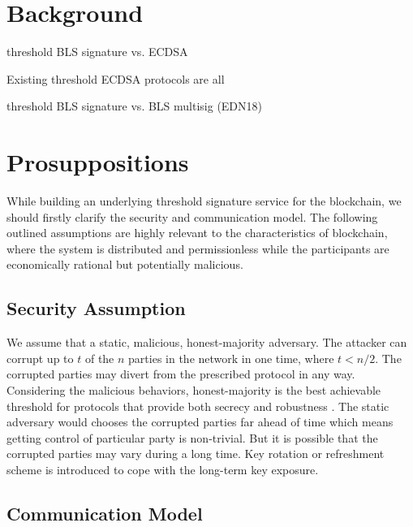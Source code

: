 \documentclass[11pt]{article}
\begin{document}
\section{Background}

threshold BLS signature vs. ECDSA

Existing threshold ECDSA protocols are all

threshold BLS signature vs. BLS multisig (EDN18)

\section{Prosuppositions}

While building an underlying threshold signature service for the blockchain, we should firstly clarify the security and communication model. The following outlined assumptions are highly relevant to the characteristics of blockchain, where the system is distributed and permissionless while the participants are economically rational but potentially malicious.

\subsection{Security Assumption}

We assume that a static, malicious, honest-majority adversary. The attacker can corrupt up to $t$ of the $n$ parties in the network in one time, where $t < n/2$. The corrupted parties may divert from the prescribed protocol in any way. Considering the malicious behaviors, honest-majority is the best achievable threshold for protocols that provide both secrecy and robustness \cite{gennaro2007secure}. The static adversary would chooses the corrupted parties far ahead of time which means getting control of particular party is non-trivial. But it is possible that the corrupted parties may vary during a long time. Key rotation or refreshment scheme is introduced to cope with the long-term key exposure.

\subsection{Communication Model}
\end{document}
